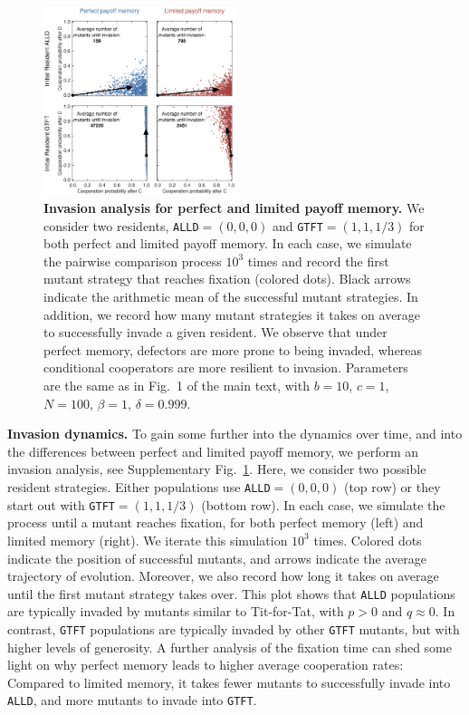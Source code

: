 \documentclass[11pt]{article}
\def\alld{\texttt{ALLD}}
\def\gtft{\texttt{GTFT}}
\theoremstyle{plainCl1}
\theoremstyle{plainCl2}
\begin{document}
\begin{figure}[t!]
    \centering    
     \includegraphics[width=0.5\textwidth]{static/invasion_analysis.eps}
    \caption{\textbf{Invasion analysis for perfect and limited payoff memory.} We consider two residents, \alld{}$=(0,0,0)$ and \gtft$=(1,1,1/3)$ for both perfect and limited payoff memory. In each case, we simulate the pairwise comparison process $10^{3}$ times and record the first mutant strategy that reaches fixation (colored dots). Black arrows indicate the arithmetic mean of the successful mutant strategies. In addition, we record how many mutant strategies it takes on average to successfully invade a given resident. We observe that under perfect memory, defectors are more prone to being invaded, whereas conditional cooperators are more resilient to invasion. Parameters are the same as in Fig.~1 of the main text, with $b\!=\!10$, $c\!=\!1$, $N\!=\!100$, $\beta\!=\!1$, $\delta\!=\!0.999$.}
    \label{fig:invasion_analysis}
\end{figure}

\noindent
{\bf Invasion dynamics.} To gain some further into the dynamics over time, and into the differences between perfect and limited payoff memory, we perform an invasion analysis, see Supplementary Fig.~\ref{fig:invasion_analysis}. 
Here, we consider two possible resident strategies. 
Either populations use \alld$=(0,0,0)$ (top row) or they start out with \gtft$=(1,1,1/3)$ (bottom row). 
In each case, we simulate the process until a mutant reaches fixation, for both perfect memory (left) and limited memory (right). 
We iterate this simulation $10^{3}$ times. 
Colored dots indicate the position of successful mutants, and arrows indicate the average trajectory of evolution. 
Moreover, we also record how long it takes on average until the first mutant strategy takes over. 
This plot shows that \alld{} populations are typically invaded by mutants similar to Tit-for-Tat, with $p\!>\!0$ and $q\!\approx\!0$. 
In contrast, \gtft{} populations are typically invaded by other \gtft{} mutants, but with higher levels of generosity. 
A further analysis of the fixation time can shed some light on why perfect memory leads to higher average cooperation rates: 
Compared to limited memory, it takes fewer mutants to successfully invade into \alld{}, and more mutants to invade into \gtft{}.\\
\end{document}
